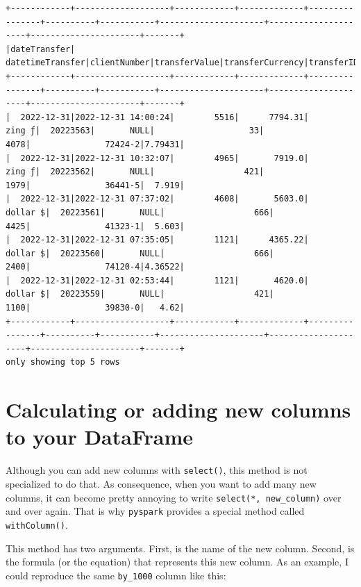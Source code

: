 \documentclass[
  11pt,
  letterpaper,
  DIV=11,
  numbers=noendperiod]{scrreprt}
\begin{document}
\begin{verbatim}
+------------+-------------------+------------+-------------+----------------+----------+-----------+---------------------+---------------------+----------------------+-------+
|dateTransfer|   datetimeTransfer|clientNumber|transferValue|transferCurrency|transferID|transferLog|destinationBankNumber|destinationBankBranch|destinationBankAccount|by_1000|
+------------+-------------------+------------+-------------+----------------+----------+-----------+---------------------+---------------------+----------------------+-------+
|  2022-12-31|2022-12-31 14:00:24|        5516|      7794.31|          zing ƒ|  20223563|       NULL|                   33|                 4078|               72424-2|7.79431|
|  2022-12-31|2022-12-31 10:32:07|        4965|       7919.0|          zing ƒ|  20223562|       NULL|                  421|                 1979|               36441-5|  7.919|
|  2022-12-31|2022-12-31 07:37:02|        4608|       5603.0|        dollar $|  20223561|       NULL|                  666|                 4425|               41323-1|  5.603|
|  2022-12-31|2022-12-31 07:35:05|        1121|      4365.22|        dollar $|  20223560|       NULL|                  666|                 2400|               74120-4|4.36522|
|  2022-12-31|2022-12-31 02:53:44|        1121|       4620.0|        dollar $|  20223559|       NULL|                  421|                 1100|               39830-0|   4.62|
+------------+-------------------+------------+-------------+----------------+----------+-----------+---------------------+---------------------+----------------------+-------+
only showing top 5 rows
\end{verbatim}

\hypertarget{calculating-or-adding-new-columns-to-your-dataframe}{%
\section{Calculating or adding new columns to your
DataFrame}\label{calculating-or-adding-new-columns-to-your-dataframe}}

Although you can add new columns with \texttt{select()}, this method is
not specialized to do that. As consequence, when you want to add many
new columns, it can become pretty annoying to write
\texttt{select(\textquotesingle{}*\textquotesingle{},\ new\_column)}
over and over again. That is why \texttt{pyspark} provides a special
method called \texttt{withColumn()}.

This method has two arguments. First, is the name of the new column.
Second, is the formula (or the equation) that represents this new
column. As an example, I could reproduce the same \texttt{by\_1000}
column like this:
\end{document}
